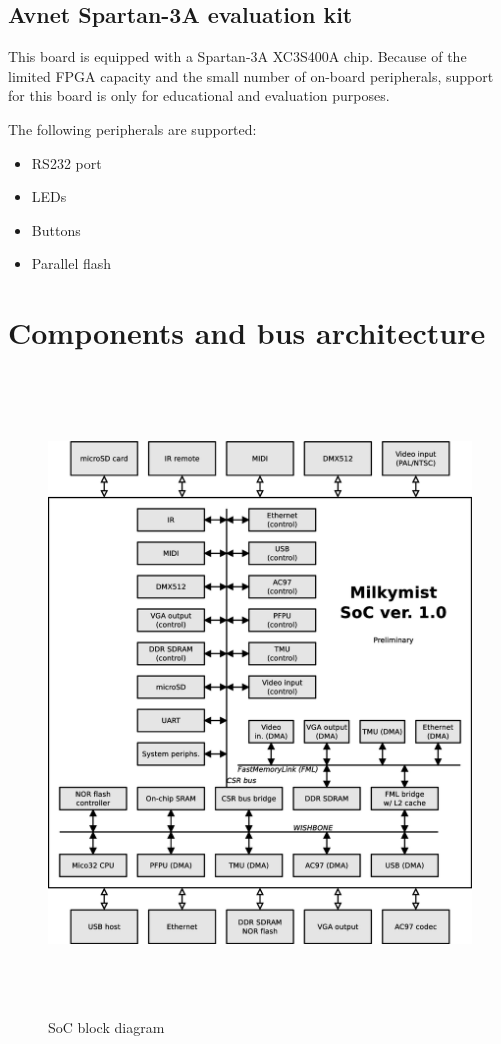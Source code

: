\documentclass[a4paper,11pt]{article}
\begin{document}
\subsection{Avnet Spartan-3A evaluation kit}
This board is equipped with a Spartan-3A XC3S400A chip. Because of the limited FPGA capacity and the small number of on-board peripherals, support for this board is only for educational and evaluation purposes.

The following peripherals are supported:
\begin{itemize}
\item RS232 port
\item LEDs
\item Buttons
\item Parallel flash
\end{itemize}

\section{Components and bus architecture}

\begin{figure}[H]
\centering
\includegraphics[height=170mm]{soc_architecture.eps}
\caption{SoC block diagram}
\end{figure}
\end{document}

